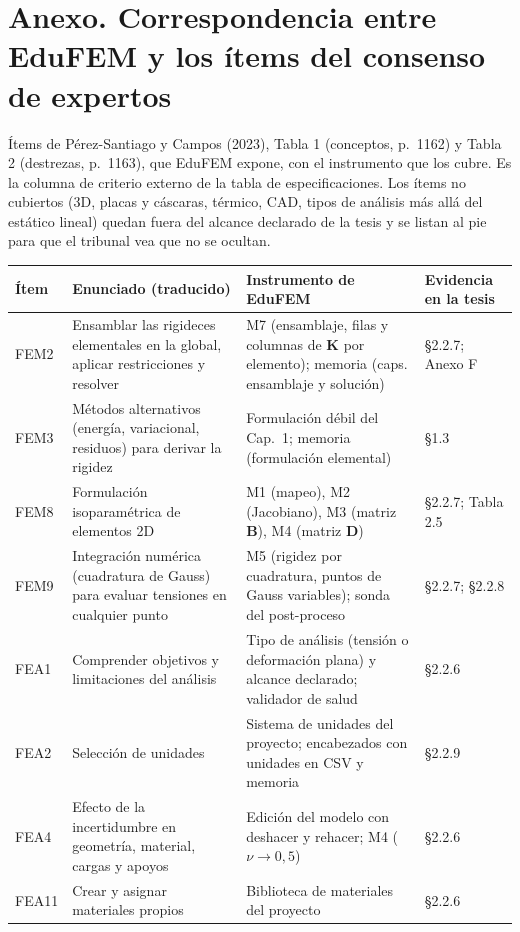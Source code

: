 \documentclass[11pt,a4paper]{article}
\begin{document}
\clearpage
\section*{Anexo. Correspondencia entre EduFEM y los ítems del consenso de expertos}

Ítems de Pérez-Santiago y Campos (2023), Tabla 1 (conceptos, p.~1162) y Tabla 2 (destrezas, p.~1163), que EduFEM expone, con el instrumento que los cubre. Es la columna de criterio externo de la tabla de especificaciones. Los ítems no cubiertos (3D, placas y cáscaras, térmico, CAD, tipos de análisis más allá del estático lineal) quedan fuera del alcance declarado de la tesis y se listan al pie para que el tribunal vea que no se ocultan.

\begin{longtable}{L{1.5cm}L{6.0cm}L{5.4cm}L{2.5cm}}
\toprule
\textbf{Ítem} & \textbf{Enunciado (traducido)} & \textbf{Instrumento de EduFEM} & \textbf{Evidencia en la tesis} \\
\midrule
\endhead
FEM2 & Ensamblar las rigideces elementales en la global, aplicar restricciones y resolver & M7 (ensamblaje, filas y columnas de $\bm{K}$ por elemento); memoria (caps. ensamblaje y solución) & §2.2.7; Anexo F \\
FEM3 & Métodos alternativos (energía, variacional, residuos) para derivar la rigidez & Formulación débil del Cap.~1; memoria (formulación elemental) & §1.3 \\
FEM8 & Formulación isoparamétrica de elementos 2D & M1 (mapeo), M2 (Jacobiano), M3 (matriz $\bm{B}$), M4 (matriz $\bm{D}$) & §2.2.7; Tabla 2.5 \\
FEM9 & Integración numérica (cuadratura de Gauss) para evaluar tensiones en cualquier punto & M5 (rigidez por cuadratura, puntos de Gauss variables); sonda del post-proceso & §2.2.7; §2.2.8 \\
FEA1 & Comprender objetivos y limitaciones del análisis & Tipo de análisis (tensión o deformación plana) y alcance declarado; validador de salud & §2.2.6 \\
FEA2 & Selección de unidades & Sistema de unidades del proyecto; encabezados con unidades en CSV y memoria & §2.2.9 \\
FEA4 & Efecto de la incertidumbre en geometría, material, cargas y apoyos & Edición del modelo con deshacer y rehacer; M4 ($\nu \to 0{,}5$) & §2.2.6 \\
FEA11 & Crear y asignar materiales propios & Biblioteca de materiales del proyecto & §2.2.6 \\

\end{longtable}
\end{document}
